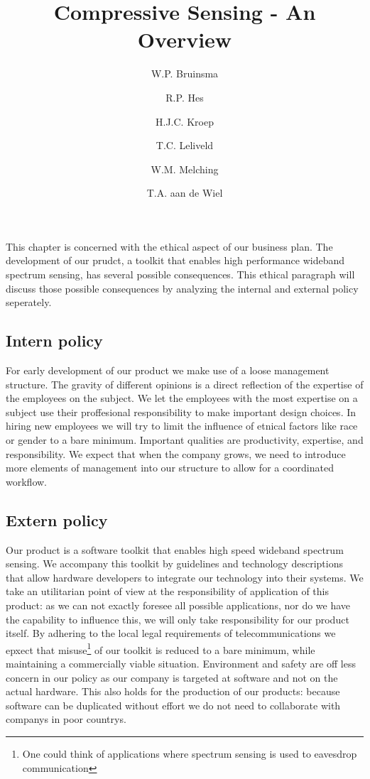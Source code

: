 \documentclass[a4paper, openany, oneside]{memoir}
\title{Compressive Sensing - An Overview}
\author{W.P. Bruinsma \and R.P. Hes \and H.J.C. Kroep \and T.C. Leliveld \and W.M. Melching \and T.A. aan de Wiel}
\begin{document}
This chapter is concerned with the ethical aspect of our business plan. The development of our prudct, a toolkit that enables high performance wideband spectrum sensing, has several possible consequences. This ethical paragraph will discuss those possible consequences by analyzing the internal and external policy seperately.

\subsection{Intern policy}

For early development of our product we make use of a loose management structure. The gravity of different opinions is a direct reflection of the expertise of the employees on the subject. We let the employees with the most expertise on a subject use their proffesional responsibility to make important design choices. In hiring new employees we will try to limit the influence of etnical factors like race or gender to a bare minimum. Important qualities are productivity, expertise, and responsibility. We expect that when the company grows, we need to introduce more elements of management into our structure to allow for a coordinated workflow.


\subsection{Extern policy}

Our product is a software toolkit that enables high speed wideband spectrum sensing. We accompany this toolkit by guidelines and technology descriptions that allow hardware developers to integrate our technology into their systems. We take an utilitarian point of view at the responsibility of application of this product: as we can not exactly foresee all possible applications, nor do we have the capability to influence this, we will only take responsibility for our product itself. By adhering to the local legal requirements of telecommunications we epxect that misuse\footnote{One could think of applications where spectrum sensing is used to eavesdrop communication} of our toolkit is reduced to a bare minimum, while maintaining a commercially viable situation. Environment and safety are off less concern in our policy as our company is targeted at software and not on the actual hardware. This also holds for the production of our products: because software can be duplicated without effort we do not need to collaborate with companys in poor countrys.
\end{document}
